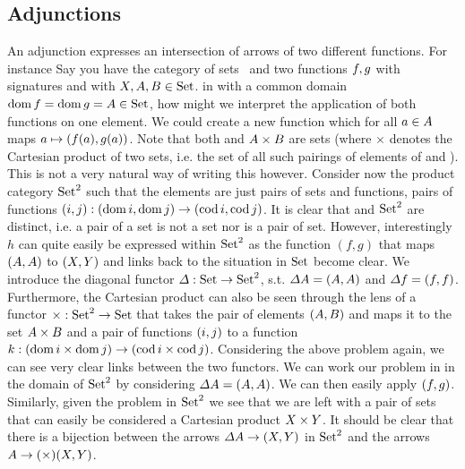 \subsection{Adjunctions}
An adjunction expresses an intersection of arrows of two different functions.
For instance Say you have the category  of sets~\cite{RelationalAlgebraByWayOfAdjunctions} and two functions $\mathnormal{f}, \mathnormal{g}$ with signatures  and  with $\mathnormal{X}, \mathnormal{A}, \mathnormal{B} \in \mathrm{Set}$.
in  with a common domain $\mathrm{dom}\,\mathnormal{f} = \mathrm{dom}\,\mathnormal{g} = \mathnormal{A}
\in \mathrm{Set}$, how might we interpret the application of both
functions on one element. We could create a new function  which for all $a \in \mathnormal{A}$ maps $a \mapsto (\mathnormal{f}(a),
\mathnormal{g}(a))$. Note that both  and $\mathnormal{A} \times \mathnormal{B}$ are sets
(where $\times$ denotes the Cartesian product of two sets, i.e. the set of all
such pairings of elements of  and ). This is not a very natural
way of writing this however. Consider now the product category
$\mathrm{Set}^2$ such that the elements are just pairs of sets and
functions, pairs of functions $(\mathnormal{i}, \mathnormal{j}): (\mathrm{dom}\,\mathnormal{i}, \mathrm{dom}\,\mathnormal{j})
\to (\mathrm{cod}\,\mathnormal{i}, \mathrm{cod}\,\mathnormal{j})$. It is clear that  and
$\mathrm{Set}^2$ are distinct, i.e. a pair of a set is not a set nor is a
pair of set. However, interestingly $h$ can quite easily be expressed within
$\mathrm{Set}^2$ as the function $(f, g)$ that maps $(\mathnormal{A}, \mathnormal{A})$
to $(\mathnormal{X}, \mathnormal{Y})$ and links back to the situation in $\mathrm{Set}$
become clear. We introduce the diagonal functor $\mathnormal{\Delta}:
\mathrm{Set} \to \mathrm{Set}^2$, s.t. $\mathnormal{\Delta} \mathnormal{A} =
(\mathnormal{A}, \mathnormal{A})$ and $\mathnormal{\Delta} \mathnormal{f} = (\mathnormal{f}, \mathnormal{f})$.
Furthermore, the Cartesian product can also be seen through the lens of a functor $\mathnormal{\times}: \mathrm{Set}^2 \to \mathrm{Set}$ that takes the pair of elements $(\mathnormal{A}, \mathnormal{B})$ and maps it to the set $\mathnormal{A} \times \mathnormal{B}$ and a pair of functions $(\mathnormal{i}, \mathnormal{j})$ to a function $k: \left(\mathrm{dom}\,\mathnormal{i} \times \mathrm{dom}\,\mathnormal{j}\right) \to \left(\mathrm{cod}\,\mathnormal{i} \times \mathrm{cod}\,\mathnormal{j}\right)$.
Considering the above problem again, we can see very clear links between the two
functors. We can work our problem in  in the domain of
$\mathrm{Set}^2$ by considering $\mathnormal{\Delta} \mathnormal{A} = (\mathnormal{A},
\mathnormal{A})$. We can then easily apply $(\mathnormal{f}, \mathnormal{g})$. Similarly, given
the problem in $\mathrm{Set}^2$ we see that we are left with a pair of
sets that can easily be considered a Cartesian product $\mathnormal{X} \times \mathnormal{Y}$. It should be clear that there is a bijection between the arrows $\mathnormal{\Delta} \mathnormal{A} \to (\mathnormal{X}, \mathnormal{Y})$ in $\mathrm{Set}^2$ and the arrows $\mathnormal{A} \to \mathnormal{(\times)} \mathnormal{(X, Y)}$.

